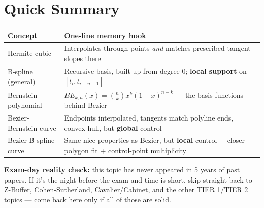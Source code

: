 \documentclass[12pt, a4paper]{article}
\newenvironment{notesbox}{\begin{mdframed}[style=notesframe]}{\end{mdframed}}
\begin{document}
\section{Quick Summary}
\begin{center}
\renewcommand{\arraystretch}{1.3}
\begin{tabular}{p{4.2cm}|p{9.3cm}}
\toprule
\textbf{Concept} & \textbf{One-line memory hook} \\
\midrule
Hermite cubic & Interpolates through points \emph{and} matches prescribed tangent slopes there \\
B-spline (general) & Recursive basis, built up from degree 0; \textbf{local support} on $[t_i,t_{i+n+1}]$ \\
Bernstein polynomial & $BE_{k,n}(x)=\binom{n}{k}x^k(1-x)^{n-k}$ --- the basis functions behind Bezier \\
Bezier-Bernstein curve & Endpoints interpolated, tangents match polyline ends, convex hull, but \textbf{global} control \\
Bezier-B-spline curve & Same nice properties as Bezier, but \textbf{local} control + closer polygon fit + control-point multiplicity \\
\bottomrule
\end{tabular}
\end{center}
\begin{notesbox}
\textbf{Exam-day reality check:} this topic has never appeared in 5 years of past papers. If it's the night before the exam and time is short, skip straight back to Z-Buffer, Cohen-Sutherland, Cavalier/Cabinet, and the other TIER 1/TIER 2 topics --- come back here only if all of those are solid.
\end{notesbox}
\end{document}

